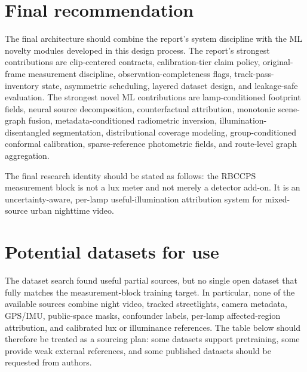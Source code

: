 \documentclass[11pt]{article}
\begin{document}
\section*{Final recommendation}

The final architecture should combine the report's system discipline with the ML novelty modules developed in this design process. The report's strongest contributions are clip-centered contracts, calibration-tier claim policy, original-frame measurement discipline, observation-completeness flags, track-pass-inventory state, asymmetric scheduling, layered dataset design, and leakage-safe evaluation. The strongest novel ML contributions are lamp-conditioned footprint fields, neural source decomposition, counterfactual attribution, monotonic scene-graph fusion, metadata-conditioned radiometric inversion, illumination-disentangled segmentation, distributional coverage modeling, group-conditioned conformal calibration, sparse-reference photometric fields, and route-level graph aggregation.

The final research identity should be stated as follows: the RBCCPS measurement block is not a lux meter and not merely a detector add-on. It is an uncertainty-aware, per-lamp useful-illumination attribution system for mixed-source urban nighttime video.

\section{Potential datasets for use}

The dataset search found useful partial sources, but no single open dataset that fully matches the measurement-block training target. In particular, none of the available sources combine night video, tracked streetlights, camera metadata, GPS/IMU, public-space masks, confounder labels, per-lamp affected-region attribution, and calibrated lux or illuminance references. The table below should therefore be treated as a sourcing plan: some datasets support pretraining, some provide weak external references, and some published datasets should be requested from authors.
\end{document}
